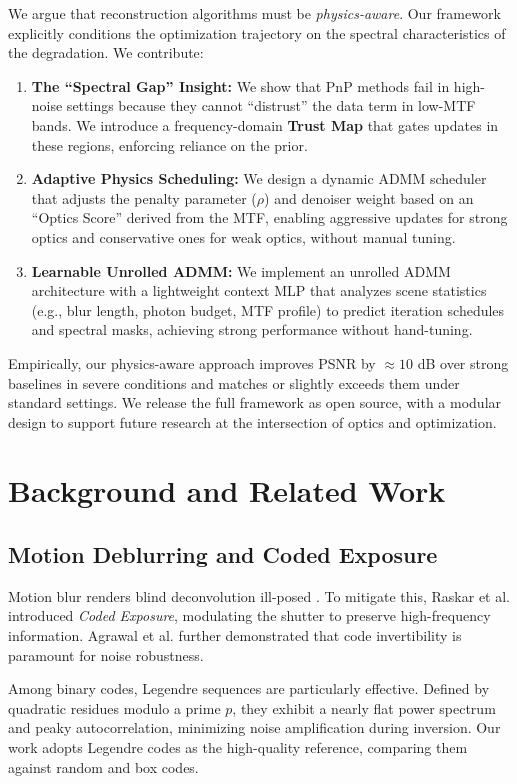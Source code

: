 \documentclass[10pt,journal,compsoc]{IEEEtran}
\begin{document}
We argue that reconstruction algorithms must be \textit{physics-aware}. Our framework explicitly conditions the optimization trajectory on the spectral characteristics of the degradation. We contribute:
\begin{enumerate}
    \item \textbf{The ``Spectral Gap'' Insight:} We show that PnP methods fail in high-noise settings because they cannot ``distrust'' the data term in low-MTF bands. We introduce a frequency-domain \textbf{Trust Map} that gates updates in these regions, enforcing reliance on the prior.
    \item \textbf{Adaptive Physics Scheduling:} We design a dynamic ADMM scheduler that adjusts the penalty parameter ($\rho$) and denoiser weight based on an ``Optics Score'' derived from the MTF, enabling aggressive updates for strong optics and conservative ones for weak optics, without manual tuning.
    \item \textbf{Learnable Unrolled ADMM:} We implement an unrolled ADMM architecture with a lightweight context MLP that analyzes scene statistics (e.g., blur length, photon budget, MTF profile) to predict iteration schedules and spectral masks, achieving strong performance without hand-tuning.
\end{enumerate}

Empirically, our physics-aware approach improves PSNR by $\approx 10$ dB over strong baselines in severe conditions and matches or slightly exceeds them under standard settings. We release the full framework as open source, with a modular design to support future research at the intersection of optics and optimization.

\section{Background and Related Work}

\subsection{Motion Deblurring and Coded Exposure}
Motion blur renders blind deconvolution ill-posed \cite{levin2009understanding}. To mitigate this, Raskar et al. \cite{raskar2006coded} introduced \textit{Coded Exposure}, modulating the shutter to preserve high-frequency information. Agrawal et al. \cite{agrawal2009optimal} further demonstrated that code invertibility is paramount for noise robustness.

Among binary codes, Legendre sequences \cite{jeon2013fluttering} are particularly effective. Defined by quadratic residues modulo a prime $p$, they exhibit a nearly flat power spectrum and peaky autocorrelation, minimizing noise amplification during inversion. Our work adopts Legendre codes as the high-quality reference, comparing them against random and box codes.
\end{document}
